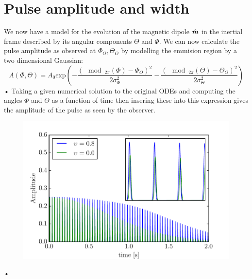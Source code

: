 \documentclass[11pt]{article}
\numberwithin{equation}{section}
\numberwithin{figure}{section}
\numberwithin{table}{section}
\begin{document}
\section{Pulse amplitude and width}
We now have a model for the evolution of the magnetic dipole $\hat{\boldsymbol{m}}$ in the inertial frame described by its angular components $\Theta$ and $\Phi$. We can now calculate the pulse amplitude as observed at $\Phi_{O}, \Theta_{O}$ by modelling the emmision region by a two dimensional Gaussian:
\begin{equation}
A(\Phi, \Theta)  = A_{0} \textrm{exp}\left(-\frac{\left(\mod_{2\pi}(\Phi)-\Phi_{O}\right)^{2}}{2\sigma_{\Phi}^{2}}-\frac{\left(\mod_{2\pi}(\Theta)-\Theta_{O}\right)^{2}}{2\sigma_{\Theta}^{2}}\right)
\end{equation}•
Taking a given numerical solution to the original ODEs and computing the angles $\Phi$ and $\Theta$ as a function of time then insering these into this expression gives the amplitude of the pulse as seen by the observer. 
\begin{figure}[ht]
\centering
\includegraphics[width=.5\textwidth]{AmplitudeModulation}
\caption{}
\label{fig: AmplitudeModulation}
\end{figure}•


	

\end{document}
